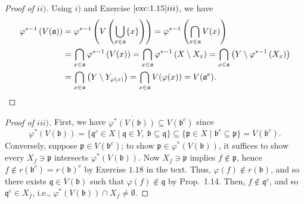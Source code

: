 \documentclass[12pt,letterpaper]{article}
\theoremstyle{definition}
\theoremstyle{remark}
\numberwithin{figure}{problem}
\numberwithin{equation}{section}
\begin{document}
\begin{proof}[Proof of
  $ii)$]
  Using
  $i)$ and Exercise
  $\ref{exc:1.15}iii)$, we have
  \begin{align*}
    \varphi^{*-1}\left(V(\mathfrak{a})\right) &%
    = \varphi^{*-1}\left( V\left( \bigcup_{x \in \mathfrak{a}} \{x\} \right) \right) = \varphi^{*-1}\left( \bigcap_{x \in \mathfrak{a}}V(x) \right)\\
    &%
    = \bigcap_{x \in \mathfrak{a}}\varphi^{*-1}\left( V(x) \right) = \bigcap_{x \in \mathfrak{a}}\varphi^{*-1}\left( X \setminus X_x \right) = \bigcap_{x \in \mathfrak{a}}\left(Y \setminus \varphi^{*-1}\left(X_x\right)\right)\\
    &%
    = \bigcap_{x \in \mathfrak{a}}\left(Y \setminus Y_{\varphi(x)}\right) = \bigcap_{x \in \mathfrak{a}} V(\varphi(x)) = V(\mathfrak{a}^e).\qedhere
  \end{align*}
\end{proof}
\begin{proof}[Proof of
  $iii)$]
  First, we have
  $\overline{\varphi^*\left( V(\mathfrak{b}) \right)} \subseteq
  V(\mathfrak{b}^c)$ since
  \begin{equation*}
    \varphi^*( V(\mathfrak{b})) = \{\mathfrak{q}^c \in X \mid \mathfrak{q} \in Y,\ \mathfrak{b} \subseteq \mathfrak{q}\} \subseteq \{\mathfrak{p} \in X \mid \mathfrak{b}^c \subseteq \mathfrak{p}\} = V(\mathfrak{b}^c).
  \end{equation*}
  Conversely, suppose
  $\mathfrak{p} \in
  V(\mathfrak{b}^c)$; to show
  $\mathfrak{p} \in \overline{\varphi^*\left( V(\mathfrak{b})
    \right)}$, it suffices to show every
  $X_f \ni
  \mathfrak{p}$ intersects
  $\varphi^*\left( V(\mathfrak{b})
  \right)$.
  Now
  $X_f \ni
  \mathfrak{p}$ implies
  $f \notin
  \mathfrak{p}$, hence
  $f \notin r(\mathfrak{b}^c) =
  r(\mathfrak{b})^c$ by Exercise
  $1.18$ in the text.
  Thus,
  $\varphi(f) \notin
  r(\mathfrak{b})$, and so there exists
  $\mathfrak{q} \in
  V(\mathfrak{b})$ such that
  $\varphi(f) \notin
  \mathfrak{q}$ by Prop.~1.14.
  Then,
  $f \notin
  \mathfrak{q}^c$, and so
  $\mathfrak{q}^c \in
  X_f$, i.e.,
  $\varphi^*(V(\mathfrak{b})) \cap X_f \ne
  \emptyset$.
\end{proof}
\end{document}
